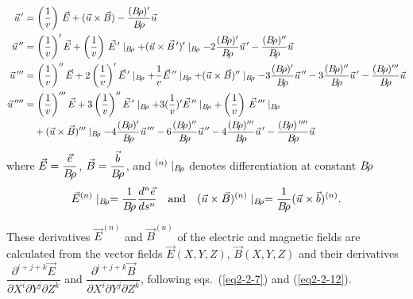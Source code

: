 \begin{equation}
	\begin{aligned}
		\vec  u^{\,\prime}    
		   & =  \left(\dfrac{1 }{ v}\right)\, \vec  E
		      + (\vec  u\times\vec  B) - 
		      \dfrac{(\Br )^\prime }{ \Br}  \vec  u \\
		\vec  u^{\,\prime\prime}  
		   &   =  \left(\dfrac{1 }{ v}\right)^\prime\vec  E 
		      + \left(\dfrac{1 }{ v}\right)\,\vec  E{^{\,\prime}} \mid_{ \Br} 
		      +(\vec u\times\vec  B^{\,\prime} )^\prime \mid_{ \Br}
		      -2 \dfrac{(\Br )^\prime }{ \Br} \vec  u^{\,\prime} 
		      - \dfrac{(\Br )^{\prime\prime} }{ \Br}  \vec  u \\
		\vec  u^{\,\prime\prime\prime} 
		   &  =   \left(\dfrac{1 }{v}\right)^{\prime\prime}\vec  E
		      +2 \left(\dfrac{1 }{ v}\right)^\prime\vec  E^{\,\prime} \mid_{ \Br}
		      +\dfrac{1 }{ v} \vec  E^{\,\prime\prime} \mid_{ \Br} 
		      +(\vec  u\times\vec B)^{\prime\prime} \mid_{ \Br}  
		      -3 \dfrac{(\Br )^\prime }{ \Br}  \vec u^{\,\prime\prime} 
		      -3 \dfrac{(\Br )^{\prime\prime} }{ \Br}  \vec  u^{\,\prime}
		      - \dfrac{(\Br )^{\prime\prime\prime} }{ \Br}  \vec  u \\
		\vec  u^{\quaprime}  
		   & =    \left(\dfrac{1}{ v}\right)^{\prime\prime\prime}  \vec  E
		      +3 \left(\dfrac{1 }{ v}\right)^{\prime\prime}\vec E^{\,\prime} \mid_{ \Br} 
		      +3( \dfrac{1 }{ v})^\prime\vec  E^{\,\prime\prime} \mid_{\Br} 
		      +\left(\dfrac{1 }{ v}\right)\, \vec  E^{\,\prime\prime\prime} \mid_{ \Br} \\
		  &  \quad + (\vec  u\times\vec B)^{\prime\prime\prime} \mid_{ \Br} 
		      -4 \dfrac{(\Br )^\prime }{ \Br}  \vec u^{\,\prime\prime\prime} 
		      -6 \dfrac{(\Br )^{\prime\prime} }{ \Br}  \vec u^{\,\prime\prime} 
		      -4 \dfrac{(\Br )^{\prime\prime\prime} }{ \Br}  \vec  u^{\,\prime} 
		      - \dfrac{(\Br )^{\quaprime} }{ \Br}  \vec  u
	\end{aligned}
	\label{eq2-2-19}
\end{equation}
%
where $ \vec  E =  \dfrac{\vec  e }{ B\!\rho} $, 
$ \vec  B =\dfrac{\vec  b }{ B\!\rho} $, and $^{(n)}\mid_{ B\!\rho} $ denotes
differentiation at constant $ B\!\rho$ 
 \begin{equation}
	 \vec  E^{(n)}\mid_{ B\!\rho} = \dfrac{1 }{ B\!\rho}  \dfrac{d^n\vec  e }{ ds^n}
	 \quad \text{and} \quad 
	 (\vec  u\times\vec  B)^{(n)}\mid_{ B\!\rho} = \dfrac{1}{B\!\rho}  (\vec  u\times\vec  b)^{(n)}.
 	\label{eq2-2-20}
 \end{equation}

\noindent These derivatives $ \vec  E^{(n)} $ and $ \vec  B^{(n)} $ of the
electric and magnetic fields are 
calculated from the vector fields $ \vec  E(X,Y,Z)$,  $ \vec  B(X,Y,Z) $ and
their derivatives  
$ \dfrac{ \partial^{i+j+k} \vec  E }{ \partial X^i \partial Y^j\partial Z^k} $ 
and 
$ \dfrac{ \partial^{ i+j+k} \vec  B }{ \partial X^i \partial Y^j \partial Z^k}$, 
following eqs.~(\ref{eq2-2-7}) and (\ref{eq2-2-12}).



